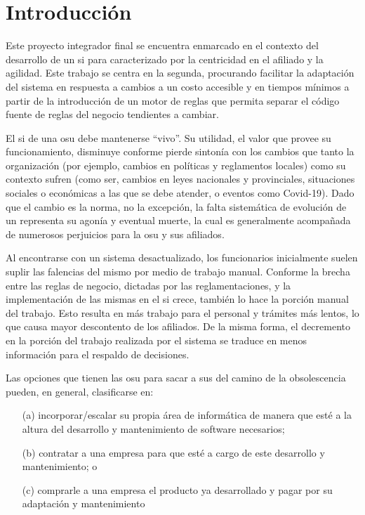 \section{Introducción}\label{sec:intro}

Este proyecto integrador final se encuentra enmarcado en el contexto del desarrollo de un \acrfull{si} para  caracterizado por la centricidad en el afiliado y la agilidad. Este trabajo se centra en la segunda, procurando facilitar la adaptación del sistema en respuesta a cambios a un costo accesible y en tiempos mínimos a partir de la introducción de un motor de reglas que permita separar el código fuente de reglas del negocio tendientes a cambiar.

El \acrshort{si} de una \acrshort{osu} debe mantenerse ``vivo''. 
Su utilidad, el valor que provee su funcionamiento, disminuye conforme pierde sintonía con los cambios que tanto la organización (por ejemplo, cambios en políticas y reglamentos locales) como su contexto sufren (como ser, cambios en leyes nacionales y provinciales, situaciones sociales o económicas a las que se debe atender, o eventos como Covid-19).
Dado que el cambio es la norma, no la excepción, la falta sistemática de evolución de un {\SIOSU} representa su agonía y eventual muerte, la cual es generalmente acompañada de numerosos perjuicios para la \acrshort{osu} y sus afiliados.

Al encontrarse con un sistema desactualizado, los funcionarios inicialmente suelen suplir las falencias del mismo por medio de trabajo manual. Conforme la brecha entre las reglas de negocio, dictadas por las reglamentaciones, y la implementación de las mismas en el \acrshort{si} crece, también lo hace la porción manual del trabajo. Esto resulta en más trabajo para el personal y trámites más lentos, lo que causa mayor descontento de los afiliados. De la misma forma, el decremento en la porción del trabajo realizada por el sistema se traduce en menos información para el respaldo de decisiones.

Las opciones que tienen las \acrshort{osu} para sacar a sus  del camino de la obsolescencia pueden, en general, clasificarse en:

\begin{enumerate}
    \item [(a)] incorporar/escalar su propia área de informática de manera que esté a la altura del desarrollo y mantenimiento de software necesarios;
    \item [(b)] contratar a una empresa para que esté a cargo de este desarrollo y mantenimiento; o
    \item [(c)] comprarle a una empresa el producto ya desarrollado y pagar por su adaptación y mantenimiento 
\end{enumerate} 

